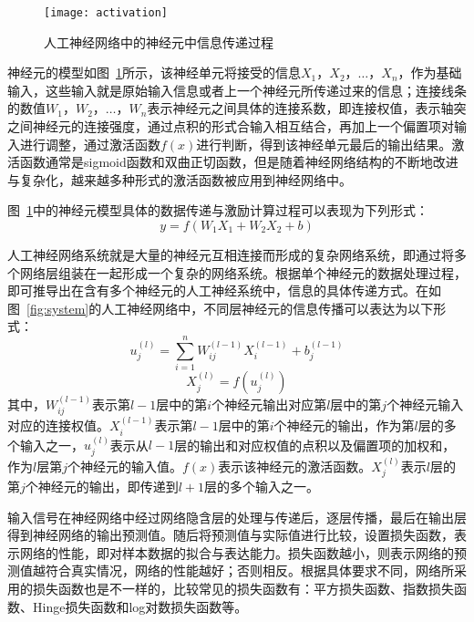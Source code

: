 \begin{figure}[H] %
  \centering
  \texttt{[image: activation]}
  \caption{人工神经网络中的神经元中信息传递过程}
  \label{fig:neuron}
\end{figure}


神经元的模型如图~\ref{fig:neuron}所示，该神经单元将接受的信息$X_1$，$X_2$，$\dots$，$X_n$，作为基础输入，这些输入就是原始输入信息或者上一个神经元所传递过来的信息；连接线条的数值$W_1$，$W_2$，$\dots$，$W_n$表示神经元之间具体的连接系数，即连接权值，表示轴突之间神经元的连接强度，通过点积的形式合输入相互结合，再加上一个偏置项对输入进行调整，通过激活函数$f(x)$进行判断，得到该神经单元最后的输出结果。激活函数通常是sigmoid函数和双曲正切函数，但是随着神经网络结构的不断地改进与复杂化，越来越多种形式的激活函数被应用到神经网络中。

图~\ref{fig:neuron}中的神经元模型具体的数据传递与激励计算过程可以表现为下列形式：
\begin{equation}
y=f(W_1 X_1 + W_2 X_2 + b)
\end{equation}

人工神经网络系统就是大量的神经元互相连接而形成的复杂网络系统，即通过将多个网络层组装在一起形成一个复杂的网络系统。根据单个神经元的数据处理过程，即可推导出在含有多个神经元的人工神经系统中，信息的具体传递方式。在如图~\ref{fig:system}的人工神经网络中，不同层神经元的信息传播可以表达为以下形式：
\begin{equation}
u_{j}^{(l)} = \sum_{i=1}^{n} W_{ij}^{(l-1)} X_{i}^{(l-1)} + b_{j}^{(l-1)}
\end{equation}
\begin{equation}
X_{j}^{(l)}=f(u_{j}^{(l)})
\end{equation}
其中，$W_{ij}^{(l-1)}$表示第$l-1$层中的第$i$个神经元输出对应第$l$层中的第$j$个神经元输入对应的连接权值。$X_i^{(l-1)}$表示第$l-1$层中的第$i$个神经元的输出，作为第$l$层的多个输入之一，$u_{j}^{(l)}$表示从$l-1$层的输出和对应权值的点积以及偏置项的加权和，作为$l$层第$j$个神经元的输入值。$f(x)$表示该神经元的激活函数。$X_{j}^{(l)}$表示$l$层的第$j$个神经元的输出，即传递到$l+1$层的多个输入之一。

输入信号在神经网络中经过网络隐含层的处理与传递后，逐层传播，最后在输出层得到神经网络的输出预测值。随后将预测值与实际值进行比较，设置损失函数，表示网络的性能，即对样本数据的拟合与表达能力。损失函数越小，则表示网络的预测值越符合真实情况，网络的性能越好；否则相反。根据具体要求不同，网络所采用的损失函数也是不一样的，比较常见的损失函数有：平方损失函数、指数损失函数、Hinge损失函数和log对数损失函数等。


